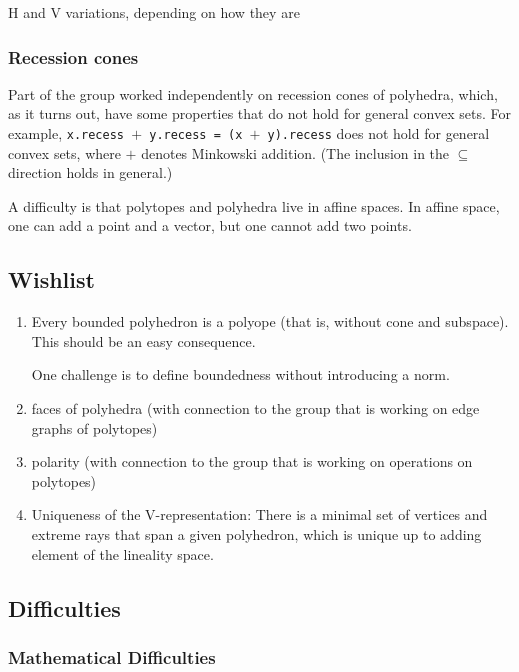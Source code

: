 \documentclass[a4paper,11pt]{article}
\newcommand\lean{\texttt}
\begin{document}
 H and V variations, depending on how they are


\subsubsection{Recession cones}
\label{sec:recession}

Part of the group worked independently on recession cones of
polyhedra, which, as it turns out, have some properties that
do not hold for general convex sets. For example,
\lean{x.recess
  $\mathop{+%
  }$ y.recess =
(x
$\mathop{+%
}$ y).recess} does not hold
for general convex sets,
where $+$ denotes Minkowski addition.
(The inclusion in the
$\subseteq$ direction holds in general.)

A difficulty is that polytopes and polyhedra live in affine spaces.
In affine space, one can add a point and a vector, but one cannot add
two points.

\subsection{Wishlist}
\label{sec:wishlist}

\begin{enumerate}
\item 
 Every bounded polyhedron is a polyope (that is, without cone and subspace).
 This should be an easy consequence.

 One challenge is to define boundedness without introducing a norm.
\item faces of polyhedra (with connection to the group that is working
  on edge graphs of polytopes)
\item polarity
   (with connection to the group that is working
  on operations on polytopes)
\item Uniqueness of the V-representation: There is a minimal set of
  vertices and extreme rays that span a given polyhedron, which is
  unique up to adding element of the lineality space.
\end{enumerate}




\subsection{Difficulties}
\label{sec:difficult}

\subsubsection{Mathematical Difficulties}
\label{sec:diff-math}
\end{document}
